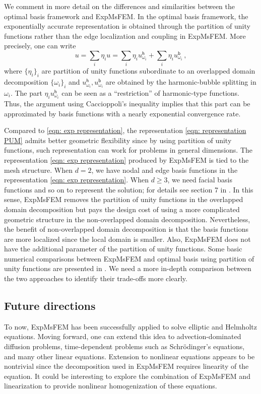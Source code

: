 \documentclass[12pt]{caltech_thesis}
\numberwithin{equation}{section}
\begin{document}
We comment in more detail on the differences and similarities between the optimal basis framework and ExpMsFEM. In the optimal basis framework, the exponentially accurate representation is obtained through the partition of unity functions rather than the edge localization and coupling in ExpMsFEM. More precisely, one can write 
\begin{equation}
\label{eqn: representation PUM}
    u = \sum_{i} \eta_i u = \sum_{i} \eta_i u^\mathsf{h}_{\omega_i} + \sum_{i} \eta_i u^\mathsf{b}_{\omega_i}\, ,
\end{equation}
where $\{\eta_i\}_i$ are partition of unity functions subordinate to an overlapped domain decomposition $\{\omega_i\}_i$ and $u_{\omega_i}^\mathsf{h}, u_{\omega_i}^\mathsf{b}$ are obtained by the harmonic-bubble splitting in $\omega_i$. The part $\eta_i u^\mathsf{h}_{\omega_i}$ can be seen as a ``restriction'' of harmonic-type functions. Thus, the argument using Caccioppoli's inequality implies that this part can be approximated by basis functions with a nearly exponential convergence rate.

Compared to \eqref{eqn: exp representation}, the representation \eqref{eqn: representation PUM} admits better geometric flexibility since by using partition of unity functions, such representation can work for problems in general dimensions. The representation \eqref{eqn: exp representation} produced by ExpMsFEM is tied to the mesh structure. When $d=2$, we have nodal and edge basis functions in the representation \eqref{eqn: exp representation}. When $d \geq 3$, we need facial basis functions and so on to represent the solution; for details see section 7 in \cite{chen2023exponentially}. In this sense, ExpMsFEM removes the partition of unity functions in the overlapped domain decomposition but pays the design cost of using a more complicated geometric structure in the non-overlapped domain decomposition. Nevertheless, the benefit of non-overlapped domain decomposition is that the basis functions are more localized since the local domain is smaller. Also, ExpMsFEM does not have the additional parameter of the partition of unity functions. Some basic numerical comparisons between ExpMsFEM and optimal basis using partition of unity functions are presented in \cite{chen2023exponentially}. We need a more in-depth comparison between the two approaches to identify their trade-offs more clearly.


\subsection{Future directions} To now, ExpMsFEM has been successfully applied to solve elliptic and Helmholtz equations. Moving forward, one can extend this idea to advection-dominated diffusion problems, time-dependent problems such as Schr\"odinger's equations, and many other linear equations. Extension to nonlinear equations appears to be nontrivial since the decomposition used in ExpMsFEM requires linearity of the equation. It could be interesting to explore the combination of ExpMsFEM and linearization to provide nonlinear homogenization of these equations.
\end{document}
